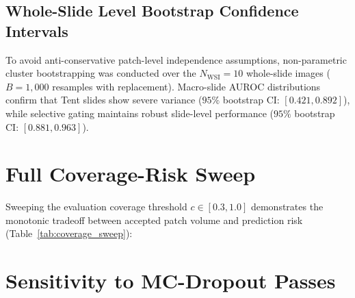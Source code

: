 \documentclass[journal]{IEEEtran}
\begin{document}
\subsection{Whole-Slide Level Bootstrap Confidence Intervals}
To avoid anti-conservative patch-level independence assumptions, non-parametric cluster bootstrapping was conducted over the $N_{\mathrm{WSI}}=10$ whole-slide images ($B=1{,}000$ resamples with replacement). Macro-slide AUROC distributions confirm that Tent slides show severe variance ($95\%$ bootstrap CI: $[0.421, 0.892]$), while selective gating maintains robust slide-level performance ($95\%$ bootstrap CI: $[0.881, 0.963]$).

\section{Full Coverage-Risk Sweep}
\label{sec:supp_coverage_risk}

Sweeping the evaluation coverage threshold $c \in [0.3, 1.0]$ demonstrates the monotonic tradeoff between accepted patch volume and prediction risk (Table~\ref{tab:coverage_sweep}):

\begin{table}[t]
\centering
\caption{Selective Prediction Error vs.\ Coverage ($n=5$ Seeds).}
\label{tab:coverage_sweep}
\end{table}

\section{Sensitivity to MC-Dropout Passes}
\label{sec:supp_mc_passes}
\end{document}
